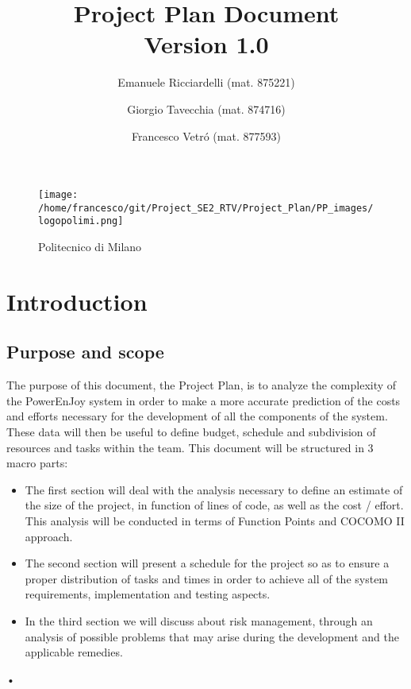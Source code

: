 \documentclass[10pt, a4paper,titlepage]{article}
\begin{document}
\begin{titlepage}
\title{Project Plan Document\\Version 1.0}
\author{Emanuele Ricciardelli (mat. 875221) \and Giorgio Tavecchia (mat. 874716) \and Francesco Vetr\'o (mat. 877593)}
\begin{figure}
\begin{center}
\texttt{[image: /home/francesco/git/Project\_SE2\_RTV/Project\_Plan/PP\_images/logopolimi.png]}
\caption{Politecnico di Milano}
\label{fig:logo}
\end{center}
\end{figure}
\maketitle
\end{titlepage}
\tableofcontents
\pagebreak
\section{Introduction}
\subsection{Purpose and scope}
The purpose of this document, the Project Plan, is to analyze the complexity of the PowerEnJoy system in order to make a more accurate prediction of the costs and efforts necessary for the development of all the components of the system.
These data will then be useful to define budget, schedule and subdivision of resources and tasks within the team.
This document will be structured in 3 macro parts:
\begin{itemize}
\item The first section will deal with the analysis necessary to define an estimate of the size of the project, in function of lines of code, as well as the cost / effort. This analysis will be conducted in terms of Function Points and COCOMO II approach.
\item The second section will present a schedule for the project so as to ensure a proper distribution of tasks and times in order to achieve all of the system requirements, implementation and testing aspects.
\item In the third section we will discuss about risk management, through an analysis of possible problems that may arise during the development and the applicable remedies.
\end{itemize}•
\end{document}
